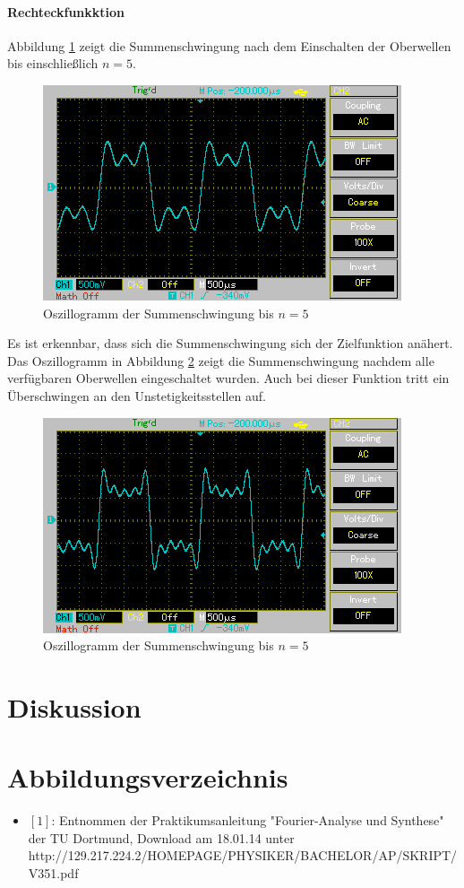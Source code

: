 \documentclass[11pt,ngerman,a4paper]{article}
\begin{document}
\paragraph{Rechteckfunkktion}
Abbildung \ref{rect_1} zeigt die Summenschwingung nach dem Einschalten der Oberwellen bis einschlie\ss lich $ n = 5$. 
\begin{figure}[htp]
\centering
\includegraphics[scale=0.8]{Screenshots/rect_1.png}
\caption{Oszillogramm  der Summenschwingung bis $n = 5$}
\label{rect_1}
\end{figure}
Es ist erkennbar, dass sich die Summenschwingung sich  der Zielfunktion an\"ahert. Das Oszillogramm in Abbildung \ref{rect_2} zeigt die Summenschwingung nachdem alle verf\"ugbaren Oberwellen eingeschaltet wurden. Auch bei dieser Funktion tritt ein \"Uberschwingen an den Unstetigkeitsstellen auf.
\begin{figure}[htp]
\centering
\includegraphics[scale=0.8]{Screenshots/rec_2.png}
\caption{Oszillogramm  der Summenschwingung bis $n = 5$}
\label{rect_2}
\end{figure}
\section{Diskussion}
\section{Abbildungsverzeichnis}
\begin{itemize}
\item $[1]$: Entnommen der Praktikumsanleitung "Fourier-Analyse und Synthese" der TU Dortmund, Download am 18.01.14 unter http://129.217.224.2/HOMEPAGE/PHYSIKER/BACHELOR/AP/SKRIPT/V351.pdf
\end{itemize}
\end{document}
